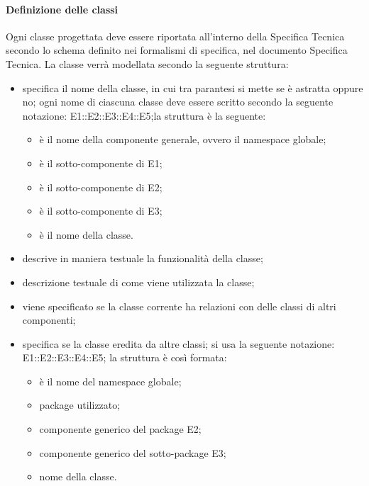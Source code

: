 \paragraph{Definizione delle classi}
\label{}
Ogni classe progettata deve essere riportata all'interno della Specifica Tecnica secondo lo schema definito nei formalismi di specifica, nel documento Specifica Tecnica. La classe verrà modellata secondo la seguente struttura:
\begin{itemize}
\item {}specifica il nome della classe, in cui tra parantesi si mette se è astratta oppure no; ogni nome di ciascuna classe deve essere scritto secondo la seguente notazione: E1::E2::E3::E4::E5;la struttura è la seguente:
\begin{itemize}
\item {}è il nome della componente generale, ovvero il namespace globale;
\item {}è il sotto-componente di E1;
\item {}è il sotto-componente di E2;
\item {}è il sotto-componente di E3;
\item {}è il nome della classe.
\end{itemize}
\item {}descrive in maniera testuale la funzionalità della classe;
\item {}descrizione testuale di come viene utilizzata la classe;
\item {}viene specificato se la classe corrente ha relazioni con delle classi di altri componenti;
\item {}specifica se la classe eredita da altre classi; si usa la seguente notazione: E1::E2::E3::E4::E5; la struttura è così formata:
\begin{itemize}
\item {}è il nome del namespace globale;
\item {}package utilizzato;
\item {}componente generico del package E2;
\item {}componente generico del sotto-package E3;
\item {}nome della classe.
\end{itemize}

\end{itemize}
